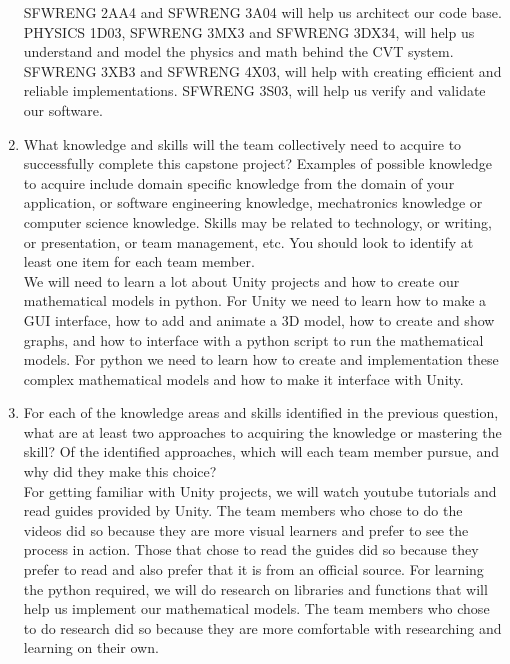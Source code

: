 \documentclass[12pt]{article}
\begin{document}
\begin{enumerate}
  SFWRENG 2AA4 and SFWRENG 3A04 will help us architect our code base.
  PHYSICS 1D03, SFWRENG 3MX3 and SFWRENG 3DX34, will help us understand and model the physics and math behind the CVT system.
  SFWRENG 3XB3 and SFWRENG 4X03, will help with creating efficient and reliable implementations.
  SFWRENG 3S03, will help us verify and validate our software.
  \item What knowledge and skills will the team collectively need to acquire to
  successfully complete this capstone project?  Examples of possible knowledge
  to acquire include domain specific knowledge from the domain of your
  application, or software engineering knowledge, mechatronics knowledge or
  computer science knowledge.  Skills may be related to technology, or writing,
  or presentation, or team management, etc.  You should look to identify at
  least one item for each team member.
  \\
  We will need to learn a lot about Unity projects and how to create our mathematical models in python.
  For Unity we need to learn how to make a GUI interface, how to add and animate a 3D model, how to create and show graphs, and how to interface with a python script to run the mathematical models.
  For python we need to learn how to create and implementation these complex mathematical models and how to make it interface with Unity.
  \item For each of the knowledge areas and skills identified in the previous
  question, what are at least two approaches to acquiring the knowledge or
  mastering the skill?  Of the identified approaches, which will each team
  member pursue, and why did they make this choice?
  \\
  For getting familiar with Unity projects, we will watch youtube tutorials and read guides provided by Unity.
  The team members who chose to do the videos did so because they are more visual learners and prefer to see the process in action.
  Those that chose to read the guides did so because they prefer to read and also prefer that it is from an official source.
  For learning the python required, we will do research on libraries and functions that will help us implement our mathematical models.
  The team members who chose to do research did so because they are more comfortable with researching and learning on their own.
\end{enumerate}
\end{document}
